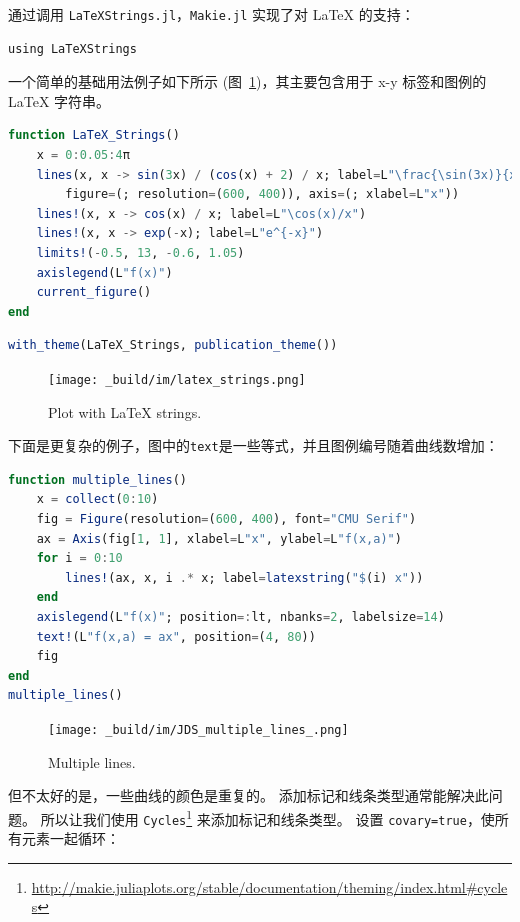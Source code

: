 \documentclass[
  notoc %
]{tufte-book}
\DeclareRobustCommand{\href}[2]{#2\footnote{\url{#1}}}
\newcommand{\passthrough}[1]{#1}
\begin{document}
通过调用
\passthrough{\lstinline!LaTeXStrings.jl!}，\passthrough{\lstinline!Makie.jl!}
实现了对 LaTeX 的支持：

\begin{lstlisting}
using LaTeXStrings
\end{lstlisting}

一个简单的基础用法例子如下所示
(图~\ref{fig:latex_strings})，其主要包含用于 x-y 标签和图例的 LaTeX
字符串。

\begin{lstlisting}[language=Julia]
function LaTeX_Strings()
    x = 0:0.05:4π
    lines(x, x -> sin(3x) / (cos(x) + 2) / x; label=L"\frac{\sin(3x)}{x(\cos(x)+2)}",
        figure=(; resolution=(600, 400)), axis=(; xlabel=L"x"))
    lines!(x, x -> cos(x) / x; label=L"\cos(x)/x")
    lines!(x, x -> exp(-x); label=L"e^{-x}")
    limits!(-0.5, 13, -0.6, 1.05)
    axislegend(L"f(x)")
    current_figure()
end
\end{lstlisting}

\begin{lstlisting}[language=Julia]
with_theme(LaTeX_Strings, publication_theme())
\end{lstlisting}

\begin{figure}
\hypertarget{fig:latex_strings}{%
\centering
\texttt{[image: \_build/im/latex\_strings.png]}
\caption{Plot with LaTeX strings.}\label{fig:latex_strings}
}
\end{figure}

下面是更复杂的例子，图中的\passthrough{\lstinline!text!}是一些等式，并且图例编号随着曲线数增加：

\begin{lstlisting}[language=Julia]
function multiple_lines()
    x = collect(0:10)
    fig = Figure(resolution=(600, 400), font="CMU Serif")
    ax = Axis(fig[1, 1], xlabel=L"x", ylabel=L"f(x,a)")
    for i = 0:10
        lines!(ax, x, i .* x; label=latexstring("$(i) x"))
    end
    axislegend(L"f(x)"; position=:lt, nbanks=2, labelsize=14)
    text!(L"f(x,a) = ax", position=(4, 80))
    fig
end
multiple_lines()
\end{lstlisting}

\begin{figure}
\hypertarget{fig:multiple_lines}{%
\centering
\texttt{[image: \_build/im/JDS\_multiple\_lines\_.png]}
\caption{Multiple lines.}\label{fig:multiple_lines}
}
\end{figure}

但不太好的是，一些曲线的颜色是重复的。
添加标记和线条类型通常能解决此问题。 所以让我们使用
\href{http://makie.juliaplots.org/stable/documentation/theming/index.html\#cycles}{\passthrough{\lstinline!Cycles!}}
来添加标记和线条类型。 设置
\passthrough{\lstinline!covary=true!}，使所有元素一起循环：
\end{document}

